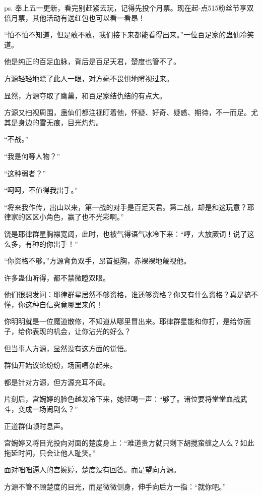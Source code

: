 
\begin{this_body}

ps. 奉上五一更新，看完别赶紧去玩，记得先投个月票。现在起-点515粉丝节享双倍月票，其他活动有送红包也可以看一看昂！

“怕不怕不知道，但是敢不敢，我们接下来都能看得出来。”一位百足家的蛊仙冷笑道。

他是纯正的百足血脉，背后是百足天君，楚度也管不了。

方源轻轻地瞟了此人一眼，对方毫不畏惧地瞪视过来。

显然，方源夺取了鹰巢，和百足家结仇结的有点大。

方源又扫视周围，蛊仙们都注视盯着他，怀疑、好奇、疑惑、期待，不一而足。尤其是身边的雪无痕，目光灼灼。

“不战。”

“我是何等人物？”

“这种弱者？”

“呵呵，不值得我出手。”

“将来我作传，出山以来，第一战的对手是百足天君。第二战，却是和这玩意？耶律家的区区小角色，赢了也不光彩啊。”

饶是耶律群星胸襟宽阔，此时，也被气得语气冰冷下来：“哼，大放厥词！说了这么多，有种的你出手！”

“你资格不够。”方源背负双手，昂首挺胸，赤裸裸地蔑视他。

许多蛊仙听得，都不禁微瞪双眼。

他们很想发问：耶律群星居然不够资格，谁还够资格？你又有什么资格？真是搞不懂，你这种自信究竟哪里来的！

你明明就是一位魔道散修，不知道从哪里冒出来。耶律群星能和你打，是给你面子，给你表现的机会，让你沾光的好么？

但当事人方源，显然没有这方面的觉悟。

群仙开始议论纷纷，场面嘈杂起来。

都是针对方源，但方源充耳不闻。

片刻后，宫婉婷的脸色越发冷下来，她轻喝一声：“够了。诸位要将堂堂血战武斗，变成一场闹剧么？”

正道群仙顿时息声。

宫婉婷又将目光投向对面的楚度身上：“难道贵方就只剩下胡搅蛮缠之人么？如此拖延时间，只会让他人耻笑。”

面对咄咄逼人的宫婉婷，楚度没有回答。而是望向方源。

方源不管不顾楚度的目光，而是微微侧身，伸手向后方一指：“就你吧。”


\end{this_body}
